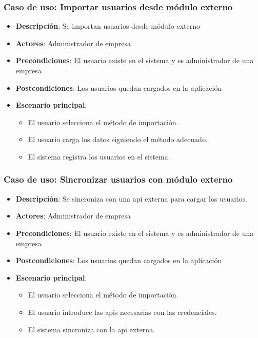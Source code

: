 \documentclass[12pt,a4paperpaper,]{report}
\providecommand{\tightlist}{%
  \setlength{\itemsep}{0pt}\setlength{\parskip}{0pt}}
\begin{document}
\subsubsection{Caso de uso: Importar usuarios desde módulo
externo}\label{caso-de-uso-importar-usuarios-desde-muxf3dulo-externo}

\begin{itemize}
\tightlist
\item
  \textbf{Descripción}: Se importan usuarios desde módulo externo
\item
  \textbf{Actores}: Administrador de empresa
\item
  \textbf{Precondiciones}: El usuario existe en el sistema y es
  administrador de una empresa
\item
  \textbf{Postcondiciones}: Los usuarios quedan cargados en la
  aplicación
\item
  \textbf{Escenario principal}:

  \begin{itemize}
  \tightlist
  \item
    El usuario selecciona el método de importación.
  \item
    El usuario carga los datos siguiendo el método adecuado.
  \item
    El sistema registra los usuarios en el sistema.
  \end{itemize}
\end{itemize}

\subsubsection{Caso de uso: Sincronizar usuarios con módulo
externo}\label{caso-de-uso-sincronizar-usuarios-con-muxf3dulo-externo}

\begin{itemize}
\tightlist
\item
  \textbf{Descripción}: Se sincroniza con una api externa para cargar
  los usuarios.
\item
  \textbf{Actores}: Administrador de empresa
\item
  \textbf{Precondiciones}: El usuario existe en el sistema y es
  administrador de una empresa
\item
  \textbf{Postcondiciones}: Los usuarios quedan cargados en la
  aplicación
\item
  \textbf{Escenario principal}:

  \begin{itemize}
  \tightlist
  \item
    El usuario selecciona el método de importación.
  \item
    El usuario introduce las apis necesarias con las credenciales.
  \item
    El sistema sincroniza con la api externa.
  \end{itemize}
\end{itemize}
\end{document}
